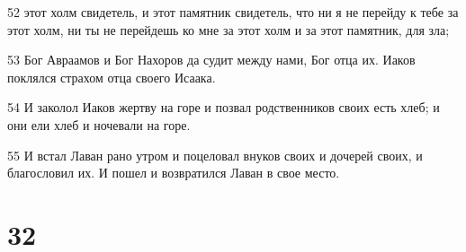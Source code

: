 \par 52 этот холм свидетель, и этот памятник свидетель, что ни я не перейду к тебе за этот холм, ни ты не перейдешь ко мне за этот холм и за этот памятник, для зла;
\par 53 Бог Авраамов и Бог Нахоров да судит между нами, Бог отца их. Иаков поклялся страхом отца своего Исаака.
\par 54 И заколол Иаков жертву на горе и позвал родственников своих есть хлеб; и они ели хлеб и ночевали на горе.
\par 55 И встал Лаван рано утром и поцеловал внуков своих и дочерей своих, и благословил их. И пошел и возвратился Лаван в свое место.

\chapter{32}

